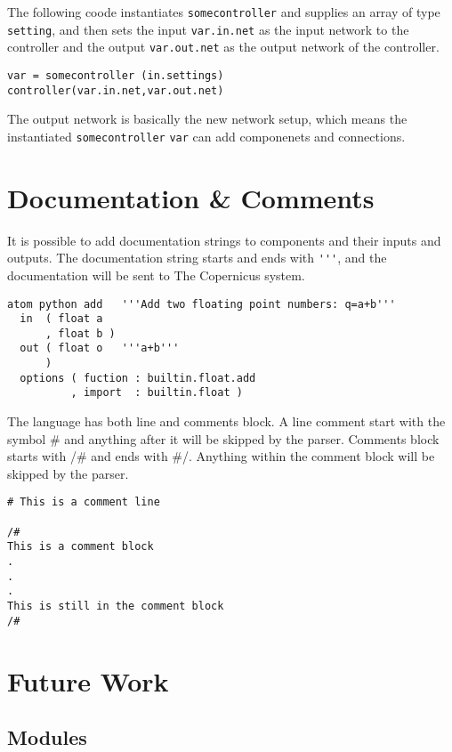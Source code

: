 The following coode instantiates \verb#somecontroller# and supplies an
array of type \verb#setting#, and then sets the input
\verb#var.in.net# as the input network to the controller and the
output \verb#var.out.net# as the output network of the controller. 

\begin{verbatim}
var = somecontroller (in.settings)
controller(var.in.net,var.out.net)
\end{verbatim}

The output network is basically the new network setup, which means the
instantiated \verb#somecontroller# \verb#var# can add componenets and
connections.

\section{Documentation \& Comments}
It is possible to add documentation strings to components and their
inputs and outputs. The documentation string starts and ends with
\verb#'''#, and the documentation will be sent to The Copernicus
system.

\begin{verbatim}
atom python add   '''Add two floating point numbers: q=a+b'''
  in  ( float a
      , float b )
  out ( float o   '''a+b'''
      )
  options ( fuction : builtin.float.add
          , import  : builtin.float )
\end{verbatim}

The language has both line and comments block. A line comment start
with the symbol \# and anything after it will be skipped by the
parser. Comments block starts with /\# and ends with \#/. Anything
within the comment block will be skipped by the parser.

\begin{verbatim}
# This is a comment line

/#
This is a comment block
.
.
.
This is still in the comment block
/#
\end{verbatim}


\section{Future Work}

\subsection{Modules}


